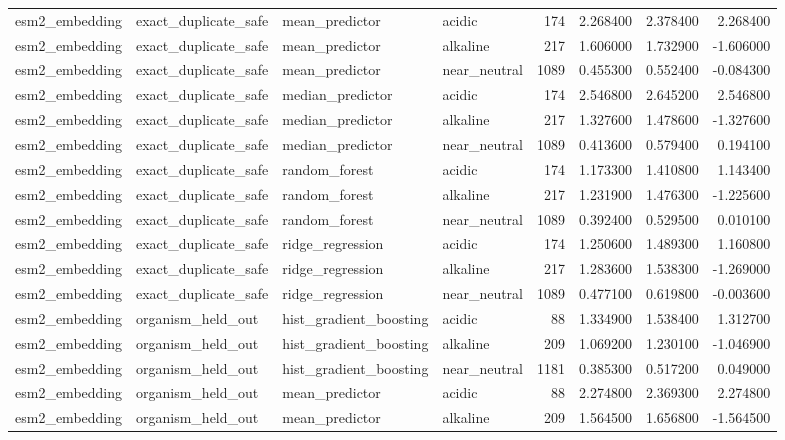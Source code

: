 \begin{longtable}{llllrrrr}
esm2\_embedding & exact\_duplicate\_safe & mean\_predictor & acidic & 174 & 2.268400 & 2.378400 & 2.268400 \\
esm2\_embedding & exact\_duplicate\_safe & mean\_predictor & alkaline & 217 & 1.606000 & 1.732900 & -1.606000 \\
esm2\_embedding & exact\_duplicate\_safe & mean\_predictor & near\_neutral & 1089 & 0.455300 & 0.552400 & -0.084300 \\
esm2\_embedding & exact\_duplicate\_safe & median\_predictor & acidic & 174 & 2.546800 & 2.645200 & 2.546800 \\
esm2\_embedding & exact\_duplicate\_safe & median\_predictor & alkaline & 217 & 1.327600 & 1.478600 & -1.327600 \\
esm2\_embedding & exact\_duplicate\_safe & median\_predictor & near\_neutral & 1089 & 0.413600 & 0.579400 & 0.194100 \\
esm2\_embedding & exact\_duplicate\_safe & random\_forest & acidic & 174 & 1.173300 & 1.410800 & 1.143400 \\
esm2\_embedding & exact\_duplicate\_safe & random\_forest & alkaline & 217 & 1.231900 & 1.476300 & -1.225600 \\
esm2\_embedding & exact\_duplicate\_safe & random\_forest & near\_neutral & 1089 & 0.392400 & 0.529500 & 0.010100 \\
esm2\_embedding & exact\_duplicate\_safe & ridge\_regression & acidic & 174 & 1.250600 & 1.489300 & 1.160800 \\
esm2\_embedding & exact\_duplicate\_safe & ridge\_regression & alkaline & 217 & 1.283600 & 1.538300 & -1.269000 \\
esm2\_embedding & exact\_duplicate\_safe & ridge\_regression & near\_neutral & 1089 & 0.477100 & 0.619800 & -0.003600 \\
esm2\_embedding & organism\_held\_out & hist\_gradient\_boosting & acidic & 88 & 1.334900 & 1.538400 & 1.312700 \\
esm2\_embedding & organism\_held\_out & hist\_gradient\_boosting & alkaline & 209 & 1.069200 & 1.230100 & -1.046900 \\
esm2\_embedding & organism\_held\_out & hist\_gradient\_boosting & near\_neutral & 1181 & 0.385300 & 0.517200 & 0.049000 \\
esm2\_embedding & organism\_held\_out & mean\_predictor & acidic & 88 & 2.274800 & 2.369300 & 2.274800 \\
esm2\_embedding & organism\_held\_out & mean\_predictor & alkaline & 209 & 1.564500 & 1.656800 & -1.564500 \\

\end{longtable}
